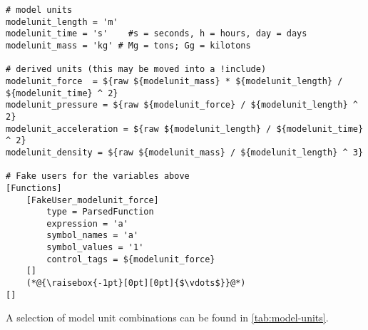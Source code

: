 \begin{lstlisting}[language=Moose, caption={Set of consistent physical units in a Moose inut file},label={patterns-physical-unit-set}]
# model units
modelunit_length = 'm'
modelunit_time = 's'    #s = seconds, h = hours, day = days
modelunit_mass = 'kg' # Mg = tons; Gg = kilotons

# derived units (this may be moved into a !include)
modelunit_force  = ${raw ${modelunit_mass} * ${modelunit_length} / ${modelunit_time} ^ 2}
modelunit_pressure = ${raw ${modelunit_force} / ${modelunit_length} ^ 2}
modelunit_acceleration = ${raw ${modelunit_length} / ${modelunit_time} ^ 2}
modelunit_density = ${raw ${modelunit_mass} / ${modelunit_length} ^ 3}

# Fake users for the variables above
[Functions]
    [FakeUser_modelunit_force]
        type = ParsedFunction
        expression = 'a'
        symbol_names = 'a'
        symbol_values = '1'
        control_tags = ${modelunit_force}
    []
    (*@{\raisebox{-1pt}[0pt][0pt]{$\vdots$}}@*)
[]
\end{lstlisting}

A selection of model unit combinations can be found in
\autoref{tab:model-units}.

